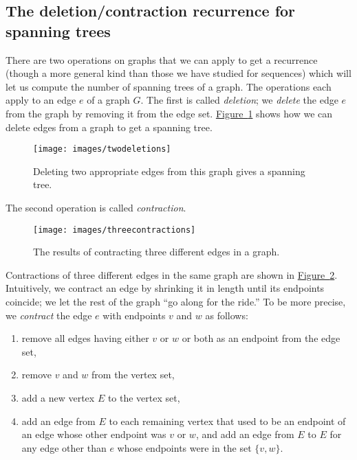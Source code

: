 \documentclass[10pt,]{book}
\theoremstyle{plain}
\theoremstyle{definition}
\theoremstyle{definition}
\numberwithin{equation}{chapter}
\begin{document}
\subsection[{The deletion/contraction recurrence for spanning trees}]{The deletion/contraction recurrence for spanning trees}\label{subsection-20}
There are two operations on graphs that we can apply to get a recurrence (though a more general kind than those we have studied for sequences) which will let us compute the number of spanning trees of a graph. The operations each apply to an edge \(e\) of a graph \(G\). The first is called \emph{deletion}; we \emph{delete} the edge \(e\) from the graph by removing it from the edge set. \hyperref[twodeletions]{Figure~\ref{twodeletions}} shows how we can delete edges from a graph to get a spanning tree.%
\begin{figure}
\centering
\texttt{[image: images/twodeletions]}
\caption{Deleting two appropriate edges from this graph gives a spanning tree.\label{twodeletions}}
\end{figure}
The second operation is called \emph{contraction}.%
\begin{figure}
\centering
\texttt{[image: images/threecontractions]}
\caption{The results of contracting three different edges in a graph.\label{threecontractions}}
\end{figure}
Contractions of three different edges in the same graph are shown in \hyperref[threecontractions]{Figure~\ref{threecontractions}}. Intuitively, we contract an edge by shrinking it in length until its endpoints coincide; we let the rest of the graph ``go along for the ride.'' To be more precise, we \emph{contract} the edge \(e\) with endpoints \(v\) and \(w\) as follows: \leavevmode%
\begin{enumerate}
\item\hypertarget{li-24}{}remove all edges having either \(v\) or \(w\) or both as an endpoint from the edge set,%
\item\hypertarget{li-25}{}remove \(v\) and \(w\) from the vertex set,%
\item\hypertarget{li-26}{}add a new vertex \(E\) to the vertex set,%
\item\hypertarget{li-27}{}add an edge from \(E\) to each remaining vertex that used to be an endpoint of an edge whose other endpoint was \(v\) or \(w\), and add an edge from \(E\) to \(E\) for any edge other than \(e\) whose endpoints were in the set \(\{v,w\}\).%
\end{enumerate}
\end{document}
